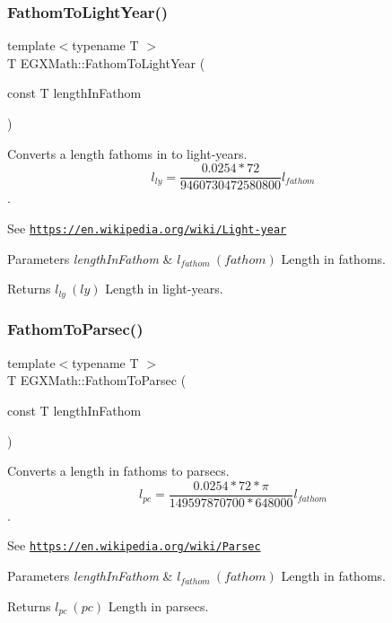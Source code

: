 \subsubsection{\texorpdfstring{Fathom\+To\+Light\+Year()}{FathomToLightYear()}}
{\footnotesize\ttfamily template$<$typename T $>$ \\
T E\+G\+X\+Math\+::\+Fathom\+To\+Light\+Year (\begin{DoxyParamCaption}\item[{const T}]{length\+In\+Fathom }\end{DoxyParamCaption})}



Converts a length fathoms in to light-\/years. \[ l_{ly}=\frac{0.0254 * 72}{9460730472580800} l_{fathom} \]. 

See \href{https://en.wikipedia.org/wiki/Light-year}{\tt https\+://en.\+wikipedia.\+org/wiki/\+Light-\/year} 
\begin{DoxyParams}{Parameters}
{\em length\+In\+Fathom} & $ l_{fathom}\ (fathom)$ Length in fathoms. \\
\hline
\end{DoxyParams}
\begin{DoxyReturn}{Returns}
$ l_{ly}\ (ly)$ Length in light-\/years. 
\end{DoxyReturn}
\mbox{\label{group___e_g_x_math-_conversions-_length_conversions-_nautical-_fathom-_astronomical_ga2ab90a2b4e56d3787d12483704d76c2d}} 
\subsubsection{\texorpdfstring{Fathom\+To\+Parsec()}{FathomToParsec()}}
{\footnotesize\ttfamily template$<$typename T $>$ \\
T E\+G\+X\+Math\+::\+Fathom\+To\+Parsec (\begin{DoxyParamCaption}\item[{const T}]{length\+In\+Fathom }\end{DoxyParamCaption})}



Converts a length in fathoms to parsecs. \[ l_{pc}=\frac{0.0254 * 72 * \pi}{149597870700 * 648000} l_{fathom} \]. 

See \href{https://en.wikipedia.org/wiki/Parsec}{\tt https\+://en.\+wikipedia.\+org/wiki/\+Parsec} 
\begin{DoxyParams}{Parameters}
{\em length\+In\+Fathom} & $ l_{fathom}\ (fathom)$ Length in fathoms. \\
\hline
\end{DoxyParams}
\begin{DoxyReturn}{Returns}
$ l_{pc}\ (pc)$ Length in parsecs. 
\end{DoxyReturn}
